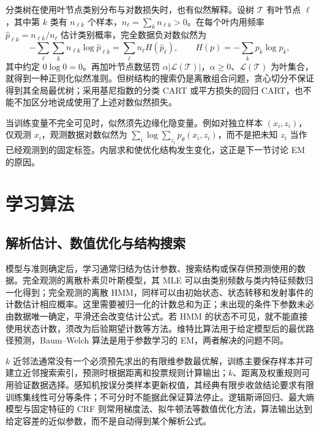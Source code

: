 分类树在使用叶节点类别分布与对数损失时，也有似然解释。设树 $\mathcal T$ 有叶节点 $\ell$，其中第 $k$ 类有 $n_{\ell k}$ 个样本，$n_\ell=\sum_k n_{\ell k}>0$。在每个叶内用频率 $\widehat p_{\ell k}=n_{\ell k}/n_\ell$ 估计类别概率，完全数据负对数似然为
\begin{equation}
-\sum_\ell\sum_k n_{\ell k}\log\widehat p_{\ell k}
=\sum_\ell n_\ell H(\widehat p_\ell),
\qquad H(p)=-\sum_k p_k\log p_k,
\label{eq:lh-summary-tree-entropy}
\end{equation}
其中约定 $0\log0=0$。再加叶节点数惩罚 $\alpha|\mathcal L(\mathcal T)|$，$\alpha\geq0$、$\mathcal L(\mathcal T)$ 为叶集合，就得到一种正则化似然准则。但树结构的搜索仍是离散组合问题，贪心切分不保证得到其全局最优树；采用基尼指数的分类 CART 或平方损失的回归 CART，也不能不加区分地说成使用了上述对数似然损失。

当训练变量不完全可见时，似然须先边缘化隐变量。例如对独立样本 $(x_i,z_i)$，仅观测 $x_i$，观测数据对数似然为 $\sum_i\log\sum_{z_i}p_\theta(x_i,z_i)$，而不是把未知 $z_i$ 当作已经观测到的固定标签。内层求和使优化结构发生变化，这正是下一节讨论 EM 的原因。

\section{学习算法}
\label{sec:lh-summary-algorithms}

\subsection{解析估计、数值优化与结构搜索}
\label{subsec:lh-summary-optimization-methods}

模型与准则确定后，学习通常归结为估计参数、搜索结构或保存供预测使用的数据。完全观测的离散朴素贝叶斯模型，其 MLE 可以由类别频数与类内特征频数归一化得到；完全观测的离散 HMM，同样可以由初始状态、状态转移和发射事件的计数估计相应概率。这里需要被归一化的计数总和为正；未出现的条件下参数未必由数据唯一确定，平滑还会改变估计公式。若 HMM 的状态不可见，就不能直接使用状态计数，须改为后验期望计数等方法。维特比算法用于给定模型后的最优路径预测，Baum--Welch 算法是用于参数学习的 EM，两者解决的问题不同。

$k$ 近邻法通常没有一个必须预先求出的有限维参数最优解，训练主要保存样本并可建立近邻搜索索引，预测时根据距离和投票规则计算输出；$k$、距离及权重规则可用验证数据选择。感知机按误分类样本更新权值，其经典有限步收敛结论要求有限训练集线性可分等条件；不可分时不能据此保证算法停止。逻辑斯谛回归、最大熵模型与固定特征的 CRF 则常用梯度法、拟牛顿法等数值优化方法，算法输出达到给定容差的近似参数，而不是自动得到某个解析公式。

